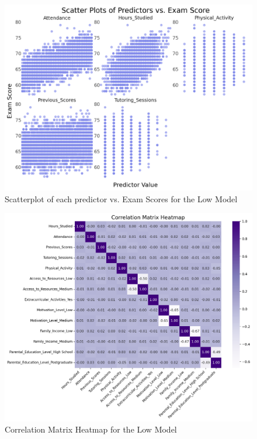 \documentclass[twocolumn]{article} %
\begin{document}
\begin{figure}[h]
  \centering
  \includegraphics[width=\columnwidth]{10-predictors-vs-exam-score.png}
  \caption{Scatterplot of each predictor vs. Exam Scores for the Low Model}
  \label{10:predictors-scatterplot}
\end{figure}

\begin{figure}[h]
  \centering
  \includegraphics[width=\columnwidth]{11-corr-heatmap.png}
  \caption{Correlation Matrix Heatmap for the Low Model}
  \label{11:corr-heatmap}
\end{figure}
\end{document}
